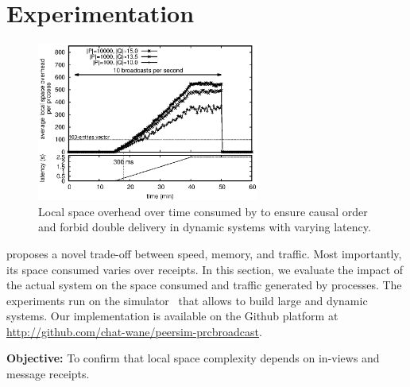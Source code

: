 
\section{Experimentation}
\label{sec:experimentation}

\begin{figure}
  \begin{center}
    \includegraphics[width=0.65\textwidth]{./img/overhead.eps}
    \caption{\label{fig:overhead}Local space overhead over time consumed by
      \RPCBROADCAST to ensure causal order and forbid double delivery in dynamic
      systems with varying latency.}
  \end{center}
\end{figure}


\RPCBROADCAST proposes a novel trade-off between speed, memory, and
traffic. Most importantly, its space consumed varies over receipts. In this
section, we evaluate the impact of the actual system on the space consumed and
traffic generated by processes. The experiments run on the \PEERSIM
simulator~\cite{montresor2009peersim} that allows to build large and dynamic
systems. Our implementation is available on the Github platform at
\url{http://github.com/chat-wane/peersim-prcbroadcast}.


%   

\noindent \textbf{Objective:} To confirm that local space complexity
depends on in-views and message receipts.


